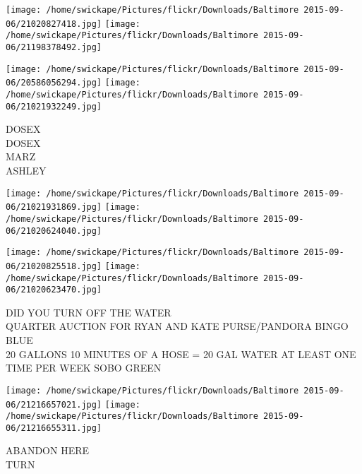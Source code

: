 \documentclass[10pt,letterpaper]{article}
\begin{document}
\texttt{[image: /home/swickape/Pictures/flickr/Downloads/Baltimore 2015-09-06/21020827418.jpg]}
\texttt{[image: /home/swickape/Pictures/flickr/Downloads/Baltimore 2015-09-06/21198378492.jpg]}

\texttt{[image: /home/swickape/Pictures/flickr/Downloads/Baltimore 2015-09-06/20586056294.jpg]}
\texttt{[image: /home/swickape/Pictures/flickr/Downloads/Baltimore 2015-09-06/21021932249.jpg]}

DOSEX\\
DOSEX\\
MARZ\\
ASHLEY\\
\pagebreak

\texttt{[image: /home/swickape/Pictures/flickr/Downloads/Baltimore 2015-09-06/21021931869.jpg]}
\texttt{[image: /home/swickape/Pictures/flickr/Downloads/Baltimore 2015-09-06/21020624040.jpg]}

\texttt{[image: /home/swickape/Pictures/flickr/Downloads/Baltimore 2015-09-06/21020825518.jpg]}
\texttt{[image: /home/swickape/Pictures/flickr/Downloads/Baltimore 2015-09-06/21020623470.jpg]}

DID YOU TURN OFF THE WATER\\
QUARTER AUCTION FOR RYAN AND KATE PURSE/PANDORA BINGO\\
BLUE\\
20 GALLONS 10 MINUTES OF A HOSE = 20 GAL WATER AT LEAST ONE TIME PER WEEK SOBO GREEN\\
\pagebreak

\texttt{[image: /home/swickape/Pictures/flickr/Downloads/Baltimore 2015-09-06/21216657021.jpg]}
\texttt{[image: /home/swickape/Pictures/flickr/Downloads/Baltimore 2015-09-06/21216655311.jpg]}

ABANDON HERE\\
TURN\\
\pagebreak
\end{document}
